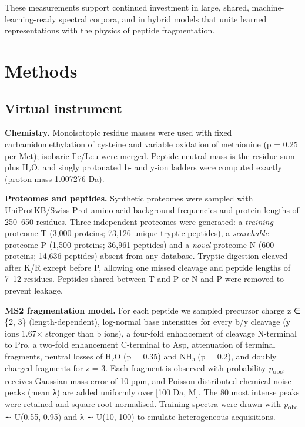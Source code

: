 \documentclass[pdflatex,sn-mathphys-num]{sn-jnl}
\begin{document}
These measurements support continued investment in large, shared, machine-learning-ready spectral corpora, and in hybrid models that unite learned representations with the physics of peptide fragmentation.

\section{Methods}\label{sec:methods}
\subsection{Virtual instrument}

\textbf{Chemistry.} Monoisotopic residue masses were used with fixed carbamidomethylation of cysteine and variable oxidation of methionine (p = 0.25 per Met); isobaric Ile/Leu were merged. Peptide neutral mass is the residue sum plus H₂O, and singly protonated b- and y-ion ladders were computed exactly (proton mass 1.007276 Da).

\textbf{Proteomes and peptides.} Synthetic proteomes were sampled with UniProtKB/Swiss-Prot amino-acid background frequencies and protein lengths of 250--650 residues. Three independent proteomes were generated: a \emph{training} proteome T (3,000 proteins; 73,126 unique tryptic peptides), a \emph{searchable} proteome P (1,500 proteins; 36,961 peptides) and a \emph{novel} proteome N (600 proteins; 14,636 peptides) absent from any database. Tryptic digestion cleaved after K/R except before P, allowing one missed cleavage and peptide lengths of 7--12 residues. Peptides shared between T and P or N and P were removed to prevent leakage.

\textbf{MS2 fragmentation model.} For each peptide we sampled precursor charge z ∈ \{2, 3\} (length-dependent), log-normal base intensities for every b/y cleavage (y ions 1.67× stronger than b ions), a four-fold enhancement of cleavage N-terminal to Pro, a two-fold enhancement C-terminal to Asp, attenuation of terminal fragments, neutral losses of H₂O (p = 0.35) and NH₃ (p = 0.2), and doubly charged fragments for z = 3. Each fragment is observed with probability \emph{p}\textsubscript{obs}, receives Gaussian mass error of 10 ppm, and Poisson-distributed chemical-noise peaks (mean λ) are added uniformly over {[}100 Da, M{]}. The 80 most intense peaks were retained and square-root-normalised. Training spectra were drawn with \emph{p}\textsubscript{obs} ∼ U(0.55, 0.95) and λ ∼ U(10, 100) to emulate heterogeneous acquisitions.
\end{document}
